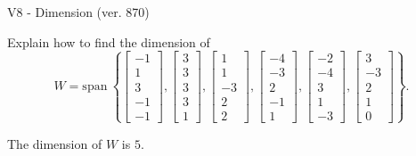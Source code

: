 \begin{exercise}
  \begin{exerciseTitle}V8 - Dimension (ver. 870)\end{exerciseTitle}
  \begin{exerciseStatement}
    Explain how to find the dimension of 
\[W=\mathrm{span}\ \left\{\left[\begin{array}{r}
-1 \\
1 \\
3 \\
-1 \\
-1
\end{array}\right] , \left[\begin{array}{r}
3 \\
3 \\
3 \\
3 \\
1
\end{array}\right] , \left[\begin{array}{r}
1 \\
1 \\
-3 \\
2 \\
2
\end{array}\right] , \left[\begin{array}{r}
-4 \\
-3 \\
2 \\
-1 \\
1
\end{array}\right] , \left[\begin{array}{r}
-2 \\
-4 \\
3 \\
1 \\
-3
\end{array}\right] , \left[\begin{array}{r}
3 \\
-3 \\
2 \\
1 \\
0
\end{array}\right]\right\}.\]



  \end{exerciseStatement}
  \begin{exerciseAnswer}
   The dimension of \(W\) is  \(5\).
  


  \end{exerciseAnswer}
\end{exercise}